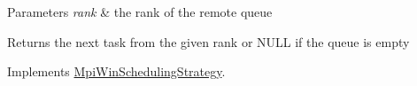 \begin{DoxyParams}{Parameters}
{\em rank} & the rank of the remote queue\\
\hline
\end{DoxyParams}
\begin{DoxyReturn}{Returns}
the next task from the given rank or N\+U\+L\+L if the queue is empty 
\end{DoxyReturn}


Implements \hyperlink{a00031_ac1804574e61c9ed91c7f78bc48b332ea}{Mpi\+Win\+Scheduling\+Strategy}.

